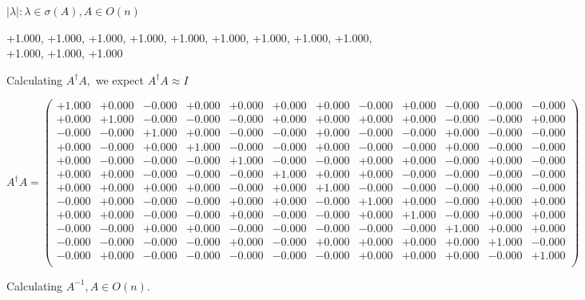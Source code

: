 \documentclass[9pt]{article}
\theoremstyle{plain}
\theoremstyle{definition}
\theoremstyle{remark}
\numberwithin{equation}{section}
\begin{document}
 $|\lambda | : \lambda \in \sigma(A) , A \in O(n)$

+1.000, +1.000, +1.000, +1.000, +1.000, +1.000, +1.000, +1.000, +1.000, +1.000, +1.000, +1.000


Calculating $A^{\dag} A,$  we expect $A^{\dag} A \approx I$

$A^{\dag} A = \left(
\begin{array}{
cccccccccccc}
+1.000 & +0.000 & -0.000 & +0.000 & +0.000 & +0.000 & +0.000 & -0.000 & +0.000 & -0.000 & -0.000 & -0.000 \\
+0.000 & +1.000 & -0.000 & -0.000 & -0.000 & +0.000 & +0.000 & +0.000 & +0.000 & -0.000 & -0.000 & +0.000 \\
-0.000 & -0.000 & +1.000 & +0.000 & -0.000 & -0.000 & +0.000 & -0.000 & -0.000 & +0.000 & -0.000 & -0.000 \\
+0.000 & -0.000 & +0.000 & +1.000 & -0.000 & -0.000 & +0.000 & -0.000 & -0.000 & +0.000 & -0.000 & -0.000 \\
+0.000 & -0.000 & -0.000 & -0.000 & +1.000 & -0.000 & -0.000 & +0.000 & +0.000 & -0.000 & +0.000 & -0.000 \\
+0.000 & +0.000 & -0.000 & -0.000 & -0.000 & +1.000 & +0.000 & +0.000 & -0.000 & -0.000 & -0.000 & -0.000 \\
+0.000 & +0.000 & +0.000 & +0.000 & -0.000 & +0.000 & +1.000 & -0.000 & -0.000 & -0.000 & +0.000 & -0.000 \\
-0.000 & +0.000 & -0.000 & -0.000 & +0.000 & +0.000 & -0.000 & +1.000 & +0.000 & -0.000 & +0.000 & +0.000 \\
+0.000 & +0.000 & -0.000 & -0.000 & +0.000 & -0.000 & -0.000 & +0.000 & +1.000 & -0.000 & +0.000 & +0.000 \\
-0.000 & -0.000 & +0.000 & +0.000 & -0.000 & -0.000 & -0.000 & -0.000 & -0.000 & +1.000 & +0.000 & +0.000 \\
-0.000 & -0.000 & -0.000 & -0.000 & +0.000 & -0.000 & +0.000 & +0.000 & +0.000 & +0.000 & +1.000 & -0.000 \\
-0.000 & +0.000 & -0.000 & -0.000 & -0.000 & -0.000 & -0.000 & +0.000 & +0.000 & +0.000 & -0.000 & +1.000 \\
\end{array}
\right)$ \newline 

Calculating $A^{-1} ,  A \in O(n)$.
\end{document}
